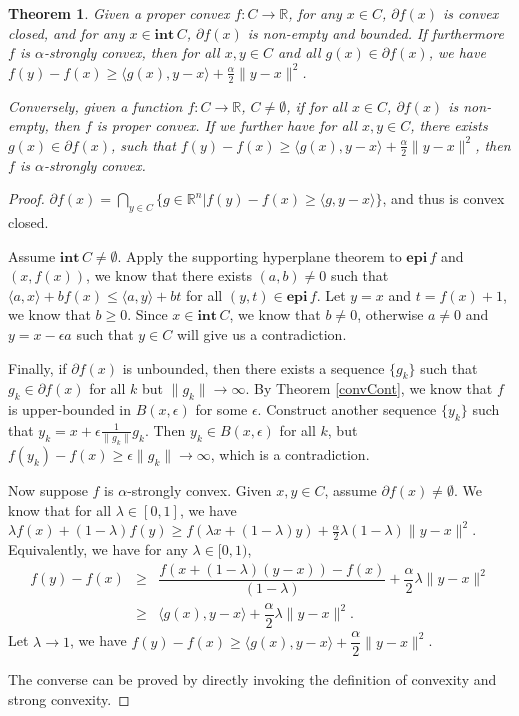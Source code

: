 \documentclass[openany]{book}
\newtheorem{theorem}{Theorem}[chapter]
\theoremstyle{definition}
\theoremstyle{remark}
\begin{document}
\begin{theorem}\label{thm:convSubgrad}
    Given a proper convex $f:C\rightarrow \mathbb{R}$, for any $x\in C$, $\partial f(x)$ is convex closed, and for any $x\in \mathbf{int}\,C$, $\partial f(x)$ is non-empty and bounded. If furthermore $f$ is $\alpha$-strongly convex, then for all $x,y\in C$ and all $g(x)\in\partial f(x)$, we have $f(y)-f(x)\ge \langle g(x),y-x\rangle+\frac{\alpha}{2}\|y-x\|^2$.

    Conversely, given a function $f:C\to \mathbb{R}$, $C\ne\emptyset$, if for all $x\in C$, $\partial f(x)$ is non-empty, then $f$ is proper convex.  If we further have for all $x,y\in C$, there exists $g(x)\in\partial f(x)$, such that $f(y)-f(x)\ge \langle g(x),y-x\rangle+\frac{\alpha}{2}\|y-x\|^2$, then $f$ is $\alpha$-strongly convex.
\end{theorem}
\begin{proof}
    $\partial f(x)=\bigcap_{y\in C}\{g\in \mathbb{R}^n|f(y)-f(x)\ge \langle g,y-x\rangle\}$, and thus is convex closed.

    Assume $\mathbf{int}\,C\ne\emptyset$. Apply the supporting hyperplane theorem to $\mathbf{epi}\,f$ and $(x,f(x))$, we know that there exists $(a,b)\ne0$ such that $\langle a,x\rangle+bf(x)\le \langle a,y\rangle+bt$ for all $(y,t)\in \mathbf{epi}\,f$. Let $y=x$ and $t=f(x)+1$, we know that $b\ge0$. Since $x\in \mathbf{int}\,C$, we know that $b\ne0$, otherwise $a\ne0$ and $y=x-\epsilon a$ such that $y\in C$ will give us a contradiction.

    Finally, if $\partial f(x)$ is unbounded, then there exists a sequence $\{g_k\}$ such that $g_k\in\partial f(x)$ for all $k$ but $\|g_k\|\to\infty$. By Theorem \ref{convCont}, we know that $f$ is upper-bounded in $B(x,\epsilon)$ for some $\epsilon$. Construct another sequence $\{y_k\}$ such that $y_k=x+\epsilon \frac{1}{\|g_k\|}g_k$. Then $y_k\in B(x,\epsilon)$ for all $k$, but $f(y_k)-f(x)\ge\epsilon\|g_k\|\to\infty$, which is a contradiction.

    Now suppose $f$ is $\alpha$-strongly convex. Given $x,y\in C$, assume $\partial f(x)\ne\emptyset$. We know that for all $\lambda\in[0,1]$, we have $\lambda f(x)+(1-\lambda)f(y)\ge f(\lambda x+(1-\lambda)y)+\frac{\alpha}{2}\lambda(1-\lambda)\|y-x\|^2$. Equivalently, we have for any $\lambda\in[0,1)$,
    \begin{equation*}
        \begin{array}{rcl}
            f(y)-f(x) & \ge & \dfrac{f(x+(1-\lambda)(y-x))-f(x)}{(1-\lambda)}+\dfrac{\alpha}{2}\lambda\|y-x\|^2 \\
             & \ge & \langle g(x),y-x\rangle+\dfrac{\alpha}{2}\lambda\|y-x\|^2.
        \end{array}
    \end{equation*}
    Let $\lambda\to1$, we have $f(y)-f(x)\ge \langle g(x),y-x\rangle+\dfrac{\alpha}{2}\|y-x\|^2$.

    The converse can be proved by directly invoking the definition of convexity and strong convexity.
\end{proof}
\end{document}
